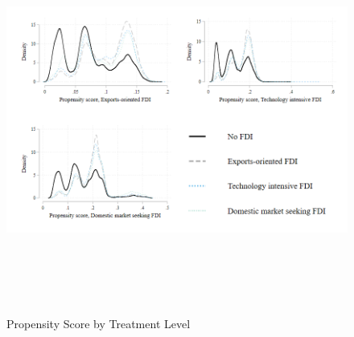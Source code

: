 \documentclass[a4paper,11pt]{scrartcl}
\begin{document}
\begin{figure}[h]
	
	\caption{Propensity Score by Treatment Level}
\hspace*{-2cm}  	
	\includegraphics[height=12cm]{overlap_type.png}\\ 
	\label{fig:over_typ}
 
\end{figure}
\end{document}
